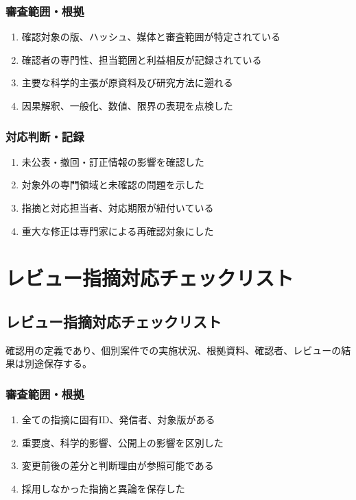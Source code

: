 \documentclass[a4paper,11pt]{article}
\begin{document}
\subsubsection*{審査範囲・根拠}
\begin{enumerate}[leftmargin=2em,itemsep=0.3em]
\item 確認対象の版、ハッシュ、媒体と審査範囲が特定されている\par
\item 確認者の専門性、担当範囲と利益相反が記録されている\par
\item 主要な科学的主張が原資料及び研究方法に遡れる\par
\item 因果解釈、一般化、数値、限界の表現を点検した\par
\end{enumerate}
\subsubsection*{対応判断・記録}
\begin{enumerate}[leftmargin=2em,itemsep=0.3em]
\item 未公表・撤回・訂正情報の影響を確認した\par
\item 対象外の専門領域と未確認の問題を示した\par
\item 指摘と対応担当者、対応期限が紐付いている\par
\item 重大な修正は専門家による再確認対象にした\par
\end{enumerate}
\section{レビュー指摘対応チェックリスト}
\subsection{レビュー指摘対応チェックリスト}
\par 確認用の定義であり、個別案件での実施状況、根拠資料、確認者、レビューの結果は別途保存する。\par\medskip
\subsubsection*{審査範囲・根拠}
\begin{enumerate}[leftmargin=2em,itemsep=0.3em]
\item 全ての指摘に固有ID、発信者、対象版がある\par
\item 重要度、科学的影響、公開上の影響を区別した\par
\item 変更前後の差分と判断理由が参照可能である\par
\item 採用しなかった指摘と異論を保存した\par
\end{enumerate}
\end{document}
